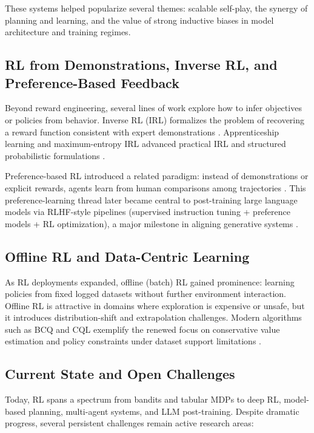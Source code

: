 \documentclass[unnumsec,webpdf,contemporary,large]{oup-authoring-template}
\theoremstyle{thmstyleone}
\theoremstyle{thmstyletwo}
\theoremstyle{thmstylethree}
\begin{document}
These systems helped popularize several themes: scalable self-play, the synergy of planning and learning, and the value of strong inductive biases in model architecture and training regimes.

\subsection{RL from Demonstrations, Inverse RL, and Preference-Based Feedback}

Beyond reward engineering, several lines of work explore how to infer objectives or policies from behavior.
Inverse RL (IRL) formalizes the problem of recovering a reward function consistent with expert demonstrations \cite{ng2000irl}.
Apprenticeship learning and maximum-entropy IRL advanced practical IRL and structured probabilistic formulations \cite{abbeel2004apprenticeship,ziebart2008maxent}.

Preference-based RL introduced a related paradigm: instead of demonstrations or explicit rewards, agents learn from human comparisons among trajectories \cite{christiano2017preferences}.
This preference-learning thread later became central to post-training large language models via RLHF-style pipelines (supervised instruction tuning + preference models + RL optimization), a major milestone in aligning generative systems \cite{ouyang2022instructgpt}.

\subsection{Offline RL and Data-Centric Learning}

As RL deployments expanded, offline (batch) RL gained prominence: learning policies from fixed logged datasets without further environment interaction.
Offline RL is attractive in domains where exploration is expensive or unsafe, but it introduces distribution-shift and extrapolation challenges.
Modern algorithms such as BCQ and CQL exemplify the renewed focus on conservative value estimation and policy constraints under dataset support limitations \cite{fujimoto2019bcq,kumar2020cql}.

\subsection{Current State and Open Challenges}

Today, RL spans a spectrum from bandits and tabular MDPs to deep RL, model-based planning, multi-agent systems, and LLM post-training.
Despite dramatic progress, several persistent challenges remain active research areas:
\end{document}
